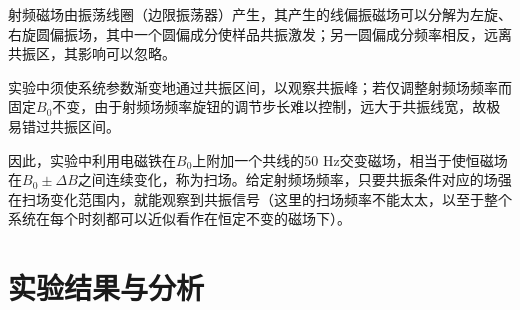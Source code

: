 \documentclass[font=default]{mpltx}
\begin{document}
射频磁场由振荡线圈（边限振荡器）产生，其产生的线偏振磁场可以分解为左旋、右旋圆偏振场，其中一个圆偏成分使样品共振激发；另一圆偏成分频率相反，远离共振区，其影响可以忽略。

实验中须使系统参数渐变地通过共振区间，以观察共振峰；若仅调整射频场频率而固定$B_0$不变，由于射频场频率旋钮的调节步长难以控制，远大于共振线宽，故极易错过共振区间。
	
因此，实验中利用电磁铁在$B_0$上附加一个共线的50 Hz交变磁场，相当于使恒磁场在$B_0 \pm\Delta B$之间连续变化，称为扫场。给定射频场频率，只要共振条件对应的场强在扫场变化范围内，就能观察到共振信号（这里的扫场频率不能太太，以至于整个系统在每个时刻都可以近似看作在恒定不变的磁场下）。

\section{实验结果与分析}
\end{document}
